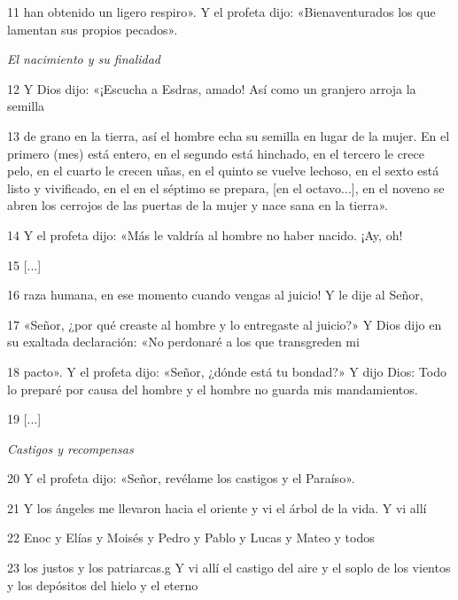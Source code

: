 \par 11 han obtenido un ligero respiro». Y el profeta dijo: «Bienaventurados los que lamentan sus propios pecados».

\par \textit{El nacimiento y su finalidad}

\par 12 Y Dios dijo: «¡Escucha a Esdras, amado! Así como un granjero arroja la semilla

\par 13 de grano en la tierra, así el hombre echa su semilla en lugar de la mujer. En el primero (mes) está entero, en el segundo está hinchado, en el tercero le crece pelo, en el cuarto le crecen uñas, en el quinto se vuelve lechoso, en el sexto está listo y vivificado, en el en el séptimo se prepara, [en el octavo...], en el noveno se abren los cerrojos de las puertas de la mujer y nace sana en la tierra».

\par 14 Y el profeta dijo: «Más le valdría al hombre no haber nacido. ¡Ay, oh!

\par 15 [...]

\par 16 raza humana, en ese momento cuando vengas al juicio! Y le dije al Señor,

\par 17 «Señor, ¿por qué creaste al hombre y lo entregaste al juicio?» Y Dios dijo en su exaltada declaración: «No perdonaré a los que transgreden mi

\par 18 pacto». Y el profeta dijo: «Señor, ¿dónde está tu bondad?» Y dijo Dios: Todo lo preparé por causa del hombre y el hombre no guarda mis mandamientos.

\par 19 [...]

\par \textit{Castigos y recompensas}

\par 20 Y el profeta dijo: «Señor, revélame los castigos y el Paraíso».

\par 21 Y los ángeles me llevaron hacia el oriente y vi el árbol de la vida. Y vi allí

\par 22 Enoc y Elías y Moisés y Pedro y Pablo y Lucas y Mateo y todos

\par 23 los justos y los patriarcas.g Y vi allí el castigo del aire y el soplo de los vientos y los depósitos del hielo y el eterno

